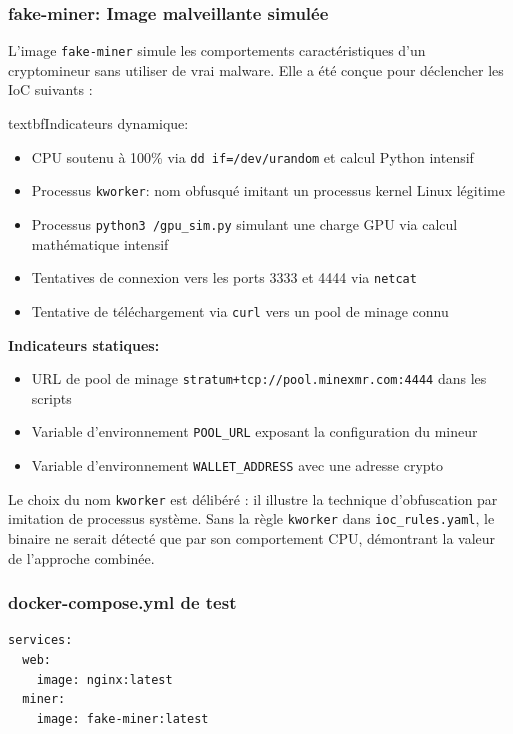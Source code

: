 \subsubsection{fake-miner: Image malveillante simulée}
L'image \texttt{fake-miner} simule les comportements caractéristiques d'un cryptomineur sans utiliser de vrai malware. Elle a été conçue pour déclencher les IoC suivants :

textbf{Indicateurs dynamique: }
\begin{itemize}
    \item CPU soutenu à 100\% via \texttt{dd if=/dev/urandom} et calcul Python intensif
    \item Processus \texttt{kworker}: nom obfusqué imitant un processus kernel Linux légitime
    \item Processus \texttt{python3 /gpu\_sim.py} simulant une charge GPU via calcul mathématique intensif
    \item Tentatives de connexion vers les ports 3333 et 4444 via \texttt{netcat}
    \item Tentative de téléchargement via \texttt{curl} vers un pool de minage connu
\end{itemize}

\textbf{Indicateurs statiques: }
\begin{itemize}
    \item URL de pool de minage \texttt{stratum+tcp://pool.minexmr.com:4444} dans les scripts
    \item Variable d'environnement \texttt{POOL\_URL} exposant la configuration du mineur
    \item Variable d'environnement \texttt{WALLET\_ADDRESS} avec une adresse crypto
\end{itemize}

Le choix du nom \texttt{kworker} est délibéré : il illustre la technique d'obfuscation par imitation de processus système. Sans la règle \texttt{kworker} dans \texttt{ioc\_rules.yaml}, le binaire ne serait détecté que par son comportement CPU, démontrant la valeur de l'approche combinée.

\subsubsection{docker-compose.yml de test}
\begin{lstlisting}[language=bash, caption=docker-compose de test]
services:
  web:
    image: nginx:latest
  miner:
    image: fake-miner:latest
\end{lstlisting}

